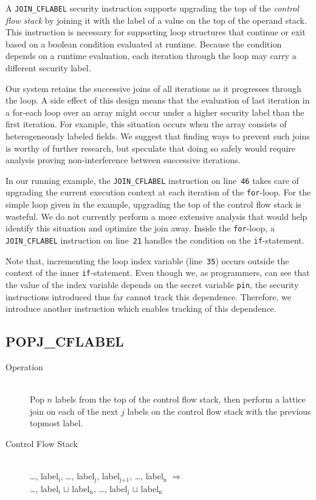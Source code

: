 \documentclass[preprint]{sigplanconf}
\newcommand{\subscript}[1]{\ensuremath{_{\textrm{#1}}}}
\begin{document}
A \texttt{JOIN\_CFLABEL} security instruction supports upgrading the top of the \textit{control flow stack} by joining it with the label of a value on the top of the operand stack.
This instruction is necessary for supporting loop structures that continue or exit based on a boolean condition evaluated at runtime.
Because the condition depends on a runtime evaluation, each iteration through the loop may carry a different security label.

Our system retains the successive joins of all iterations as it progresses through the loop.
A side effect of this design means that the evaluation of last iteration in a for-each loop over an array might occur under a higher security label than the first iteration.
For example, this situation occurs when the array consists of heterogeneously labeled fields.
We suggest that finding ways to prevent such joins is worthy of further research, but speculate that doing so safely would require analysis proving non-interference between successive iterations.

In our running example, the \texttt{JOIN\_CFLABEL} instruction on line~\texttt{46} takes care of upgrading the current execution context at each iteration of the \texttt{for}-loop.
For the simple loop given in the example, upgrading the top of the control flow stack is wasteful.
We do not currently perform a more extensive analysis that would help identify this situation and optimize the join away.
Inside the \texttt{for}-loop, a \texttt{JOIN\_CFLABEL} instruction on line~\texttt{21} handles the condition on the \texttt{if}-statement.

Note that, incrementing the loop index variable (line~\texttt{35}) occurs outside the context of the inner \texttt{if}-statement.
Even though we, as programmers, can see that the value of the index variable depends on the secret variable \texttt{pin}, the security instructions introduced thus far cannot track this dependence.
Therefore, we introduce another instruction which enables tracking of this dependence.

\subsection{POPJ\_CFLABEL}

\begin{description}
\item[Operation] \hfill \\
 Pop $n$ labels from the top of the control flow stack, then perform a lattice join on each of the next $j$ labels on the control flow stack with the previous topmost label.
\item[Control Flow Stack] \hfill \\
 \ldots, label\subscript{i}, \ldots, label\subscript{j}, label\subscript{j+1}, \ldots, label\subscript{n} $\Rightarrow$ \\
 \ldots, label\subscript{i} $\sqcup$ label\subscript{n}, \ldots, label\subscript{j} $\sqcup$ label\subscript{n}
\end{description}
\end{document}
